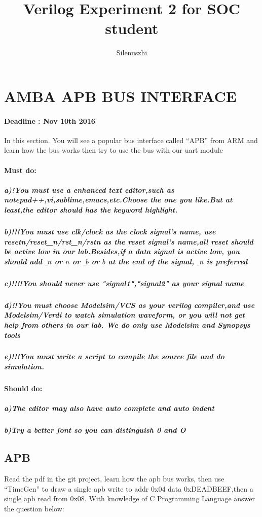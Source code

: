 \documentclass{article}
\author{Silenuszhi}
\title{Verilog Experiment 2 for SOC student}
\begin{document}
\maketitle
\newpage{}
\section{AMBA APB BUS INTERFACE}
\paragraph{Deadline : Nov 10th 2016\\}
In this section. You will see a popular bus interface called ``APB'' from ARM and learn how the bus works then try to use the bus with our uart module
\paragraph{Must do:}
\subparagraph {a)!You must use a enhanced text editor,such as notepad++,vi,sublime,emacs,etc.Choose the one you like.But at least,the editor should has the keyword highlight.}
\subparagraph {b)!!!You must use clk/clock as the clock signal's name, use resetn/reset\_n/rst\_n/rstn as the reset signal's name,all reset should be active low in our lab.Besides,if a data signal is active low, you should add $\_n$ or $n$ or $\_b$ or $b$ at the end of the signal, $\_n$ is preferred}
\subparagraph {c)!!!!You should never use "signal1","signal2" as your signal name}
\subparagraph {d)!!You must choose Modelsim/VCS as your verilog compiler,and use Modelsim/Verdi to watch simulation waveform, or you will not get help from others in our lab. We do only use Modelsim and Synopsys tools}
\subparagraph {e)!!!You must write a script to compile the source file and do simulation.}
\paragraph{Should do:}
\subparagraph {a)The editor may also have auto complete and auto indent}
\subparagraph {b)Try a better font so you can distinguish 0 and O}
\subsection{APB}
Read the pdf in the git project, learn how the apb bus works,
then use ``TimeGen'' to draw a single apb write to addr 0x04 data 0xDEADBEEF,then a single apb read from 0x08.
With knowledge of C Programming Language answer the question below:\\
\end{document}

